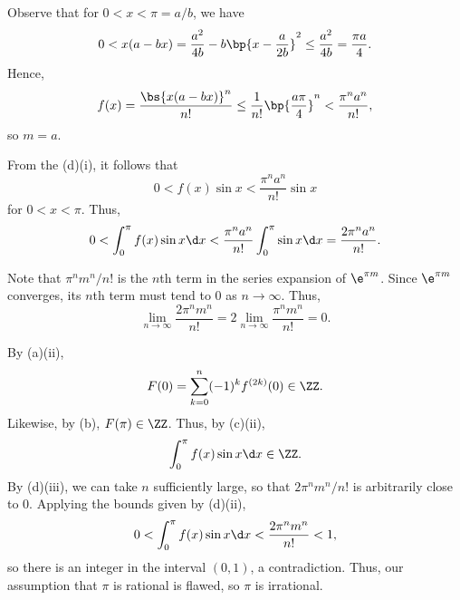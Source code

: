 \begin{solution}
\begin{ppart}
\begin{psubpart}
        \end{psubpart}
    \end{ppart}
    \begin{ppart}
        \begin{psubpart}
            Observe that for $0 < x < \pi = a/b$, we have \[0 < x(a-bx) = \frac{a^2}{4b} - b\bp{x - \frac{a}{2b}}^2 \leq \frac{a^2}{4b} = \frac{\pi a}{4}.\] Hence, \[f(x) = \frac{\bs{x(a-bx)}^n}{n!} \leq \frac1{n!} \bp{\frac{a\pi}{4}}^n < \frac{\pi^n a^n}{n!},\] so $m = a$.
        \end{psubpart}
        \begin{psubpart}
            From the (d)(i), it follows that \[0 < f(x) \sin x < \frac{\pi^n a^n}{n!} \sin x\] for $0 < x < \pi$. Thus, \[0 < \int_0^\pi f(x) \sin x \d x < \frac{\pi^n a^n}{n!} \int_0^\pi \sin x \d x = \frac{2\pi^n a^n}{n!}.\]
        \end{psubpart}
        \begin{psubpart}
            Note that $\pi^n m^n / n!$ is the $n$th term in the series expansion of $\e^{\pi m}$. Since $\e^{\pi m}$ converges, its $n$th term must tend to 0 as $n \to \infty$. Thus, \[\lim_{n \to \infty} \frac{2\pi^n m^n}{n!}  = 2\lim_{n \to \infty} \frac{\pi^n m^n}{n!} = 0.\]
        \end{psubpart}
    \end{ppart}
    \begin{ppart}
        By (a)(ii), \[F(0) = \sum_{k = 0}^n (-1)^k f^{(2k)}(0) \in \ZZ.\] Likewise, by (b), $F(\pi) \in \ZZ$. Thus, by (c)(ii), \[\int_0^\pi f(x) \sin x \d x \in \ZZ.\] By (d)(iii), we can take $n$ sufficiently large, so that $2\pi^n m^n/n!$ is arbitrarily close to 0. Applying the bounds given by (d)(ii), \[0 < \int_0^\pi f(x) \sin x \d x < \frac{2\pi^n m^n}{n!} < 1,\] so there is an integer in the interval $(0, 1)$, a contradiction. Thus, our assumption that $\pi$ is rational is flawed, so $\pi$ is irrational.
    \end{ppart}
\end{solution}